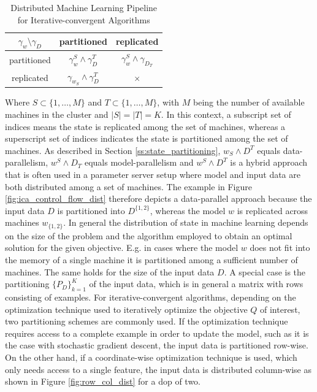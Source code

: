 \begin{table}[h]
\begin{center}
\begin{tabular}{ | c | c | c |}
\hline
$\gamma_w \setminus \gamma_D$ & partitioned & replicated \\ \hline
partitioned & $\gamma_w^S \wedge \gamma_D^T$ &  $\gamma_w^S \wedge \gamma_{D_T}$\\ \hline
replicated & $\gamma_{w_S} \wedge \gamma_D^T$ & $\times$\\
\hline
\end{tabular}
\label{tab:ica_partitioning}
\caption{Distributed Machine Learning Pipeline for Iterative-convergent Algorithms}
\end{center}
\end{table}
Where $S \subset \{1, \ldots, M\}$ and $T \subset \{1, \ldots, M\}$, with $M$ being the number of available machines in the cluster and $\mid S \mid = \mid T \mid = K$.
In this context, a subscript set of indices means the state is replicated among the set of machines, whereas a superscript set of indices indicates the state is partitioned among the set of machines.
As described in Section \ref{ss:state_partitioning}, $w_S \wedge D^T$ equals data-parallelism, $w^S \wedge D_T$ equals model-parallelism and $w^S \wedge D^T$ is a hybrid approach that is often used in a parameter server setup where model and input data are both distributed among a set of machines.
The example in Figure \ref{fig:ica_control_flow_dist} therefore depicts a data-parallel approach because the input data $D$ is partitioned into $D^{\{1,2\}}$, whereas the model $w$ is replicated across machines $w_{\{1,2\}}$.
In general the distribution of state in machine learning depends on the size of the problem and the algorithm employed to obtain an optimal solution for the given objective.
E.g. in cases where the model $w$ does not fit into the memory of a single machine it is partitioned among a sufficient number of machines.
The same holds for the size of the input data $D$.
A special case is the partitioning $\{P_D\}_{k=1}^K$ of the input data, which is in general a matrix with rows consisting of examples.
For iterative-convergent algorithms, depending on the optimization technique used to iteratively optimize the objective $Q$ of interest, two partitioning schemes are commonly used.
If the optimization technique requires access to a complete example in order to update the model, such as it is the case with stochastic gradient descent, the input data is partitioned row-wise.
On the other hand, if a coordinate-wise optimization technique is used, which only needs access to a single feature, the input data is distributed column-wise as shown in Figure \ref{fig:row_col_dist} for a dop of two.
